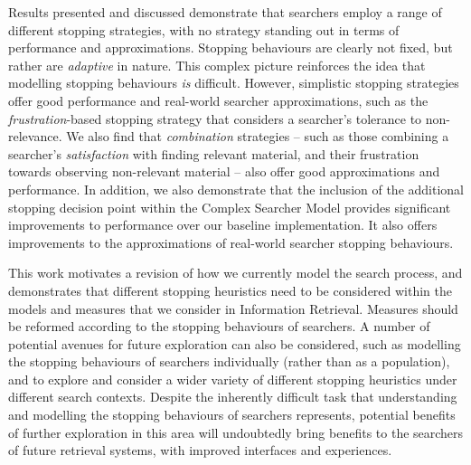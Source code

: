 \begin{preamble}
Results presented and discussed demonstrate that searchers employ a range of different stopping strategies, with no strategy standing out in terms of performance and approximations. Stopping behaviours are clearly not fixed, but rather are \emph{adaptive} in nature. This complex picture reinforces the idea that modelling stopping behaviours \emph{is} difficult. However, simplistic stopping strategies offer good performance and real-world searcher approximations, such as the \emph{frustration}-based stopping strategy that considers a searcher's tolerance to non-relevance. We also find that \emph{combination} strategies -- such as those combining a searcher's \emph{satisfaction} with finding relevant material, and their frustration towards observing non-relevant material -- also offer good approximations and performance. In addition, we also demonstrate that the inclusion of the additional stopping decision point within the Complex Searcher Model provides significant improvements to performance over our baseline implementation. It also offers improvements to the approximations of real-world searcher stopping behaviours.

This work motivates a revision of how we currently model the search process, and demonstrates that different stopping heuristics need to be considered within the models and measures that we consider in Information Retrieval. Measures should be reformed according to the stopping behaviours of searchers. A number of potential avenues for future exploration can also be considered, such as modelling the stopping behaviours of searchers individually (rather than as a population), and to explore and consider a wider variety of different stopping heuristics under different search contexts. Despite the inherently difficult task that understanding and modelling the stopping behaviours of searchers represents, potential benefits of further exploration in this area will undoubtedly bring benefits to the searchers of future retrieval systems, with improved interfaces and experiences.

\end{preamble}
